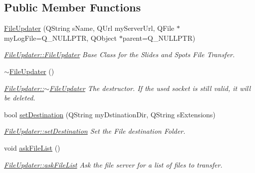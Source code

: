 \subsection*{Public Member Functions}
\begin{DoxyCompactItemize}
\item 
\mbox{\hyperlink{classFileUpdater_ae72e563d822b8daef58e2c2f515af3fc}{File\+Updater}} (Q\+String s\+Name, Q\+Url my\+Server\+Url, Q\+File $\ast$my\+Log\+File=Q\+\_\+\+N\+U\+L\+L\+P\+TR, Q\+Object $\ast$parent=Q\+\_\+\+N\+U\+L\+L\+P\+TR)
\begin{DoxyCompactList}\small\item\em \mbox{\hyperlink{classFileUpdater_ae72e563d822b8daef58e2c2f515af3fc}{File\+Updater\+::\+File\+Updater}} Base Class for the Slides and Spots File Transfer. \end{DoxyCompactList}\item 
\mbox{\label{classFileUpdater_a5759d843d1dcb702f1adbb97e61bb440}} 
\mbox{\hyperlink{classFileUpdater_a5759d843d1dcb702f1adbb97e61bb440}{$\sim$\+File\+Updater}} ()
\begin{DoxyCompactList}\small\item\em \mbox{\hyperlink{classFileUpdater_a5759d843d1dcb702f1adbb97e61bb440}{File\+Updater\+::$\sim$\+File\+Updater}} The destructor. If the used socket is still valid, it will be deleted. \end{DoxyCompactList}\item 
bool \mbox{\hyperlink{classFileUpdater_aad3c90fbc960c8aa84b964f3ae1d8f11}{set\+Destination}} (Q\+String my\+Dstination\+Dir, Q\+String s\+Extensions)
\begin{DoxyCompactList}\small\item\em \mbox{\hyperlink{classFileUpdater_aad3c90fbc960c8aa84b964f3ae1d8f11}{File\+Updater\+::set\+Destination}} Set the File destination Folder. \end{DoxyCompactList}\item 
\mbox{\label{classFileUpdater_a7935a0431987ac2bcdd0b602afc69203}} 
void \mbox{\hyperlink{classFileUpdater_a7935a0431987ac2bcdd0b602afc69203}{ask\+File\+List}} ()
\begin{DoxyCompactList}\small\item\em \mbox{\hyperlink{classFileUpdater_a7935a0431987ac2bcdd0b602afc69203}{File\+Updater\+::ask\+File\+List}} Ask the file server for a list of files to transfer. \end{DoxyCompactList}\end{DoxyCompactItemize}


